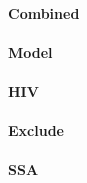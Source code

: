 \documentclass{article}
\begin{document}
\paragraph{Combined} \n\nobreak{}
\paragraph{Model}    \n\nobreak{}
\paragraph{HIV}      \n\nobreak{}
\paragraph{Exclude}  \n\nobreak{}
\paragraph{SSA}      \n\nobreak{}

%
%
\end{document}
